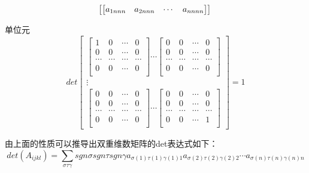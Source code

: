 \documentclass[twoside,a4paper,CCT]{cctart}   %
\begin{document}
\begin{define}
\begin{list}{}
$$\begin{bmatrix}
\begin{bmatrix}
   a_{1nnn}& a_{2nnn}&\cdots&a_{nnnn}\\
   \end{bmatrix}
    \end{bmatrix}\\$$
   \item
   单位元
$$det \begin{bmatrix}
 \begin{bmatrix}
   1& 0&\cdots&0\\
   0& 0&\cdots&0\\
  \cdots& \cdots&\cdots&\cdots \\
0& 0&\cdots&0\\
\end{bmatrix}
\cdots
\begin{bmatrix}
  0& 0&\cdots&0\\
  0& 0&\cdots&0\\
  \cdots& \cdots&\cdots&\cdots \\
 0& 0&\cdots&0\\
 \end{bmatrix}\\
\vdots\\
\begin{bmatrix}
  0& 0&\cdots&0\\
  0& 0&\cdots&0\\
  \cdots& \cdots&\cdots&\cdots \\
   0& 0&\cdots&0\\
   \end{bmatrix}
\cdots
\begin{bmatrix}
  0& 0&\cdots&0\\
  0& 0&\cdots&0\\
  \cdots& \cdots&\cdots&\cdots \\
   0& 0&\cdots&1\\
   \end{bmatrix}
    \end{bmatrix}
    =1$$
 \end{list}
\end{define}
\begin{theorem} 由上面的性质可以推导出双重维数矩阵的det表达式如下：
$$det(A_{ijkl})=\sum \limits_{\sigma\tau\gamma}sgn\sigma sgn\tau sgn\gamma a_{\sigma(1)\tau(1)\gamma(1)1} a_{\sigma(2)\tau(2)\gamma(2)2}\cdots a_{\sigma(n)\tau(n)\gamma(n)n}$$
\end{theorem}
\end{document}
